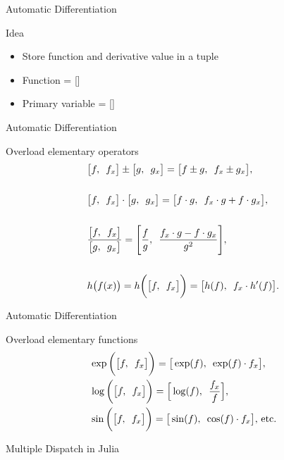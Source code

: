 \begin{frame}{Automatic Differentiation}
    \begin{block}{Idea}
        \begin{itemize}
            \item Store function and derivative value in a tuple
            \item Function = []
            \item Primary variable = []
        \end{itemize}
    \end{block}
\end{frame}
\begin{frame}{Automatic Differentiation}
    \begin{block}{Overload elementary operators}
        \begin{equation*}
            \begin{aligned}
                &\big[f,\hspace{0.5em}f_x\big] \pm \big[g,\hspace{0.5em}g_x   \big] = \big[f \pm g,\hspace{0.5em}f_x \pm g_x \big] ,\\\\
                &\big[  f,\hspace{0.5em}f_x   \big]\cdot \big[  g,\hspace{0.5em}g_x   \big] = \big[  f\cdot g,\hspace{0.5em}f_x\cdot g + f\cdot g_x   \big],\\\\
                &\frac{\big[ f,\hspace{0.5em}f_x   \big]}{\big[  g,\hspace{0.5em}g_x   \big]} = \Bigg[  \frac{f}{g},\hspace{0.5em}\frac{f_x\cdot g - f\cdot g_x}{g^2}\Bigg],\\\\
                &h\big(f(x)\big) = h\bigg(\big[ f ,\hspace{0.5em}f_x  \big]\bigg) = \big[ h(f),\hspace{0.5em} f_x\cdot h'(f) \big].
            \end{aligned}
        \end{equation*}
    \end{block}
\end{frame}
\begin{frame}{Automatic Differentiation}
    \begin{block}{Overload elementary functions}
        \begin{equation*}
            \begin{aligned}
                &\exp\bigg(\big[ f,\hspace{0.5em}f_x  \big]\bigg) =  \big[ \exp(f),\hspace{0.5em}\exp(f)\cdot f_x  \big],\\
                &\log\bigg(\big[ f,\hspace{0.5em}f_x  \big]\bigg) =  \Big[  \log(f),\hspace{0.5em}\frac{f_x}{f}   \Big],\\
                &\sin\bigg(\big[  f,\hspace{0.5em}f_x   \big]\bigg) =  \big[  \sin(f),\hspace{0.5em}\cos(f)\cdot f_x   \big]\text{,  etc.}
            \end{aligned}
        \end{equation*}
    \end{block}
    \pause
    \centering
    \vspace{2em}
    \Huge Multiple Dispatch in Julia
\end{frame}
